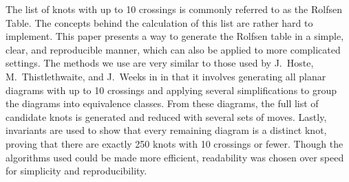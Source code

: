 
\code
\diagrams
\theorems

\begin{paperabs}
The list of knots with up to 10 crossings is commonly referred to as the Rolfsen
Table.
The concepts behind the calculation of this list are rather hard to implement.
This paper presents a way to generate the Rolfsen table in a simple, clear, and
reproducible manner, which can also be applied to more complicated settings.
The methods we use are very similar to those used by J.~Hoste,
M.~Thistlethwaite, and J.~Weeks in \cite{htw} in that it involves generating all
planar diagrams with up to 10 crossings and applying several simplifications to
group the diagrams into equivalence classes.
From these diagrams, the full list of candidate knots is generated and reduced
with several sets of moves.
Lastly, invariants are used to show that every remaining diagram is a distinct
knot, proving that there are exactly 250 knots with 10 crossings or fewer.
Though the algorithms used could be made more efficient, readability was chosen
over speed for simplicity and reproducibility.
\end{paperabs}
